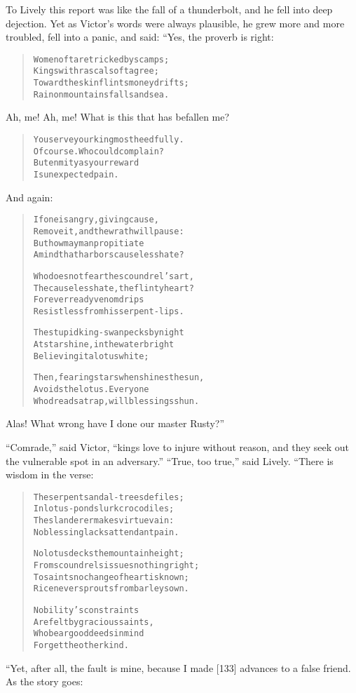\documentclass[article, twoside, 14pt]{memoir}
\renewenvironment{verbatim}{%
\begin{quote}%
\vskip -10pt%
\begin{alltt}\normalfont\large}{\end{alltt}%
\end{quote}%
\vskip -10pt
} %
\begin{document}
To Lively this report was like the fall of a thunderbolt, and he
fell into deep dejection. Yet as Victor's words were always
plausible, he grew more and more troubled, fell into a panic, and
said: “Yes, the proverb is right:

\begin{verbatim}
Women oft are tricked by scamps;
    Kings with rascals oft agree;
Toward the skinflints money drifts;
    Rain on mountains falls and sea.
\end{verbatim}
Ah, me! Ah, me! What is this that has befallen me?

\begin{verbatim}
You serve your king most heedfully.
    Of course. Who could complain?
But enmity as your reward
    Is unexpected pain.
\end{verbatim}
And again:

\begin{verbatim}
If one is angry, giving cause,
Remove it, and the wrath will pause:
But how may man propitiate
A mind that harbors causeless hate?

Who does not fear the scoundrel's art,
The causeless hate, the flinty heart?
For ever ready venom drips
Resistless from his serpent-lips.

The stupid king-swan pecks by night
At starshine, in the water bright
Believing it a lotus white;

Then, fearing stars when shines the sun,
Avoids the lotus. Everyone
Who dreads a trap, will blessings shun.
\end{verbatim}
Alas! What wrong have I done our master Rusty?”

``Comrade,'' said Victor,
``kings love to injure without reason, and they seek out the vulnerable spot in an adversary.''
``True, too true,'' said Lively. “There is wisdom in the verse:

\begin{verbatim}
The serpent sandal-trees defiles;
In lotus-ponds lurk crocodiles;
The slanderer makes virtue vain:
No blessing lacks attendant pain.

No lotus decks the mountain height;
From scoundrels issues nothing right;
To saints no change of heart is known;
Rice never sprouts from barley sown.

Nobility's constraints
Are felt by gracious saints,
Who bear good deeds in mind
Forget the other kind.
\end{verbatim}
“Yet, after all, the fault is mine, because I made [133] advances
to a false friend. As the story goes:
\end{document}
